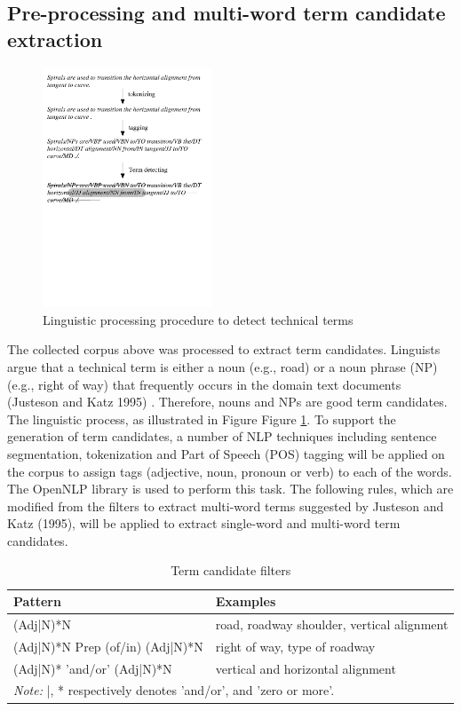\documentclass[Journal, InsideFigs, DoubleSpace]{ascelike} %
\begin{document}
\subsection{Pre-processing and multi-word term candidate extraction}
%
\begin{figure}[t]
\centering
\includegraphics[width=0.45\textwidth]{NP_detecting}
\caption{Linguistic processing procedure to detect technical terms}
\label{fig:np_detect}
\end{figure}
%
The collected corpus above was processed to extract term candidates. Linguists argue that a technical term is either a noun (e.g., road) or a noun phrase (NP) (e.g., right of way) that frequently occurs in the domain text documents (Justeson and Katz 1995) \cite{justeson95}. Therefore, nouns and NPs are good term candidates. The linguistic process, as illustrated in Figure Figure \ref{fig:np_detect}. To support the generation of term candidates, a number of NLP techniques including sentence segmentation, tokenization and Part of Speech (POS) tagging will be applied on the corpus to assign tags (adjective, noun, pronoun or verb) to each of the words. The OpenNLP library is used to perform this task. The following rules, which are modified from the filters to extract multi-word terms suggested by Justeson and Katz (1995)\cite{justeson95}, will be applied to extract single-word and multi-word term candidates.
%
\begin{table} [t]
	\caption{Term candidate filters}
	\label{table:term_filter}
	\centering
	\small
	\renewcommand{\arraystretch}{1.25}
	\begin{tabular}{l l}
		\hline
		\textbf{Pattern} & \textbf{Examples}\\
		\hline
		(Adj|N)*N		& road, roadway shoulder, vertical alignment\\
		(Adj|N)*N Prep (of/in) (Adj|N)*N	&	right of way, type of roadway\\
		(Adj|N)* 'and/or' (Adj|N)*N & vertical and horizontal alignment\\
		\hline
		\multicolumn{2}{l}{\textit{Note:} |, * respectively denotes 'and/or', and 'zero or more'.  } \\
		\hline
	\end{tabular}
	
	\normalsize
\end{table}
\end{document}
